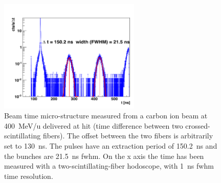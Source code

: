 \begin{figure} [!hbtp]	
  \centering
	\includegraphics[width=0.6\textwidth]{03_GraphicFiles/chapter4_HTsimu/BeamTimeStruct.png} 
  \caption{Beam time micro-structure measured from a carbon ion beam at 400~MeV/u delivered at \gls{hit} (time difference between two crossed-scintillating fibers). The offset between the two fibers is arbitrarily set to 130~ns. The pulses have an extraction period of 150.2~ns and the bunches are 21.5~ns \gls{fwhm}.  On the x axis the time has been measured with a two-scintillating-fiber hodoscope, with 1~ns \gls{fwhm} time resolution.}
  \label{chap4::fig::fig_HIT_timeStruct}
\end{figure}


